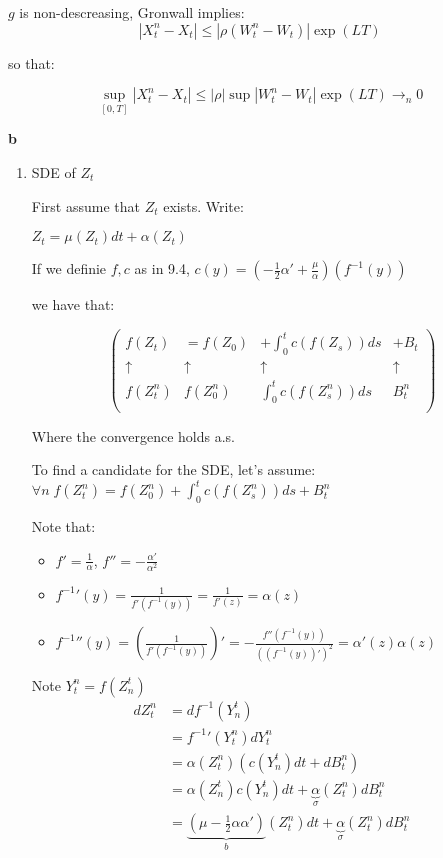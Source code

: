 \documentclass[11pt]{article}
\begin{document}
\(g\) is non-descreasing, Gronwall implies:
$$|X_t^n - X_t| \le |\rho(W_t^n - W_t)| \exp(LT)$$

so that:

$$\sup_{[0, T]} |X_t^n - X_t| \le |\rho| \sup|W_t^n - W_t| \exp(LT) \rightarrow_n 0$$

\textbf{b}

\begin{enumerate}
\item SDE of \(Z_t\)
\label{sec:orgheadline3}


First assume that \(Z_t\) exists. Write:

\(Z_t = \mu(Z_t) dt + \alpha(Z_t)\)

If we definie \(f, c\) as in 9.4,
\(c(y) = (- \frac12 \alpha' + \frac \mu{\alpha})(f^{-1}(y))\)

we have that:

\[\begin{pmatrix}
f(Z_t) &= f(Z_0) &+ \int_0^t c(f(Z_s)) ds &+ B_t\\
\uparrow & \uparrow & \uparrow & \uparrow\\
f(Z^n_t) & f(Z^n_0) & \int_0^t c(f(Z^n_s)) ds & B^n_t\\
\end{pmatrix}\]

Where the convergence holds a.s.


To find a candidate for the SDE, let's assume:
\(\forall n \; f(Z^n_t) = f(Z^n_0) + \int_0^t c(f(Z^n_s)) ds + B^n_t\)



Note that:
\begin{itemize}
\item \(f' = \frac1{\alpha}\), \(f'' = -\frac{\alpha'}{\alpha^2}\)
\item \({f^{-1}}'(y) = \frac1{f'(f^{-1}(y))} = \frac1{f'(z)} = \alpha(z)\)
\item \({f^{-1}}''(y) = (\frac1{f'(f^{-1}(y))})' = -\frac{f''(f^{-1}(y))}{((f^{-1}(y))')^2} = \alpha'(z)\alpha(z)\)
\end{itemize}


Note \(Y^n_t = f(Z_n^t)\)
\begin{align*}
dZ^n_t &= df^{-1}( Y_n^t)
\\&= {f^{-1}}'(Y_t^n) dY^n_t
\\&= \alpha(Z^n_t) (c(Y_n^t) dt + dB^n_t) 
\\&= \alpha(Z_n^t) c(Y_n^t) dt + \underbrace{\alpha}_{\sigma}(Z^n_t) dB^n_t
\\&= \underbrace{(\mu - \frac12 \alpha \alpha')}_{b}(Z_t^n)dt + \underbrace{\alpha}_{\sigma}(Z^n_t) dB^n_t
\end{align*}



\end{enumerate}
\end{document}

